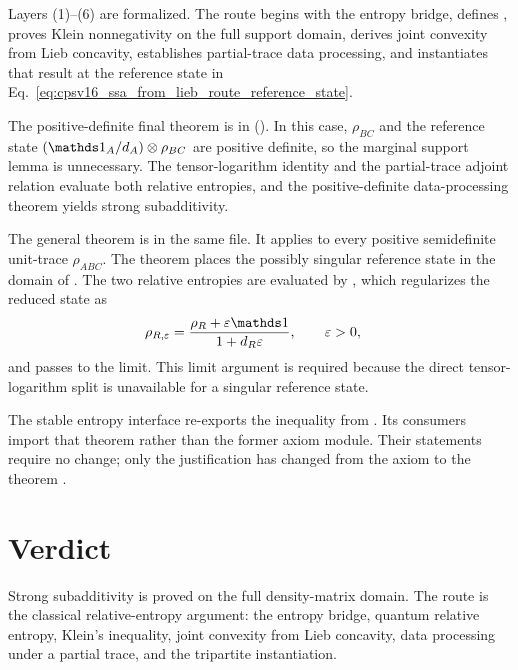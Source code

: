 \documentclass[11pt]{article}
\begin{document}
Layers (1)--(6) are formalized. The route begins with the entropy bridge,
defines , proves Klein nonnegativity on the full
support domain, derives joint convexity from Lieb concavity, establishes
partial-trace data processing, and instantiates that result at the reference
state in Eq.~\ref{eq:cpsv16_ssa_from_lieb_route_reference_state}.

The positive-definite final theorem is
 in
(). In this case,
$\rho_{BC}$ and the reference state
$(\Id_A/d_A)\otimes\rho_{BC}$ are positive definite, so the marginal support
lemma is unnecessary. The tensor-logarithm identity and the partial-trace
adjoint relation evaluate both relative entropies, and the positive-definite
data-processing theorem yields strong subadditivity.

The general theorem is  in the same file.
It applies to every positive semidefinite unit-trace $\rho_{ABC}$. The theorem
 places the possibly singular reference state
in the domain of
. The two relative
entropies are evaluated by , which regularizes
the reduced state as
\begin{align}
    \rho_{R,\varepsilon}
        &= \frac{\rho_R+\varepsilon\Id}{1+d_R\varepsilon},
        \qquad \varepsilon>0,
    \label{eq:cpsv16_ssa_from_lieb_route_reduced_state_regularization}
\end{align}
and passes to the limit. This limit argument is required because the direct
tensor-logarithm split is unavailable for a singular reference state.

The stable entropy interface re-exports the inequality from
. Its consumers import that theorem
rather than the former axiom module. Their statements require no change; only
the justification has changed from the axiom  to
the theorem .

\section{Verdict}

Strong subadditivity is proved on the full density-matrix domain. The route is
the classical relative-entropy argument: the entropy bridge, quantum relative
entropy, Klein's inequality, joint convexity from Lieb concavity, data
processing under a partial trace, and the tripartite instantiation.
\end{document}
